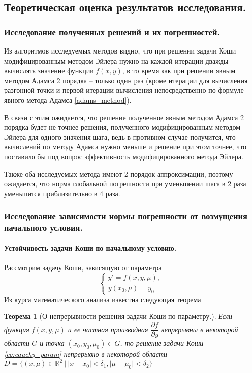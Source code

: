 \documentclass[a4paper, 12pt]{article}
\theoremstyle{mythm}
\newtheorem{theorem}{Теорема}
\begin{document}
	\subsection{Теоретическая оценка результатов исследования.}
	
	\subsubsection{Исследование полученных решений и их погрешностей.}
	
	Из алгоритмов исследуемых методов видно, что при решении задачи Коши модифицированным методом Эйлера нужно на каждой итерации дважды вычислять значение функции $f(x,y)$, в то время как при решении явным методом Адамса 2 порядка -- только один раз (кроме итерации для вычисления разгонной точки и первой итерации вычисления непосредственно по формуле явного метода Адамса \eqref{adams_method}).
	
	В связи с этим ожидается, что решение полученное явным методом Адамса 2 порядка будет не точнее решения, полученного модифицированным методом Эйлера для одного значения шага, ведь в противном случае получится, что вычислений по методу Адамса нужно меньше и решение при этом точнее, что поставило бы под вопрос эффективность модифицированного метода Эйлера. 
	
	Также оба исследуемых метода имеют 2 порядок аппроксимации, поэтому ожидается, что норма глобальной погрешности при уменьшении шага в 2 раза уменьшится приблизительно в 4 раза.
	
	\subsubsection{Исследование зависимости нормы погрешности от возмущения начального условия.}
	
	\paragraph{Устойчивость задачи Коши по начальному условию.} 
	
	Рассмотрим задачу Коши, зависящую от параметра
	\begin{equation} \label{eq:cauchy_param}
		\begin{cases}
			y' = f(x,y,\mu),\\
			y(x_0,\mu) = y_0
		\end{cases}
	\end{equation}
	Из курса математического анализа известна следующая теорема
	\begin{theorem}[О непрерывности решения задачи Коши по параметру.] \label{th:param}
		Если функция $f(x,y,\mu)$ и ее частная производная $\dfrac{\partial f}{\partial y}$ непрерывны в некоторой области $G$ и точка $(x_0, y_0, \mu_0)\in G$, то решение задачи Коши \eqref{eq:cauchy_param} непрерывно в некоторой области $D =\{(x,\mu)\in\mathbb{R}^2\ |\ |x-x_0|<\delta_1, |\mu-\mu_0|<\delta_2\}$
	\end{theorem}
\end{document}
